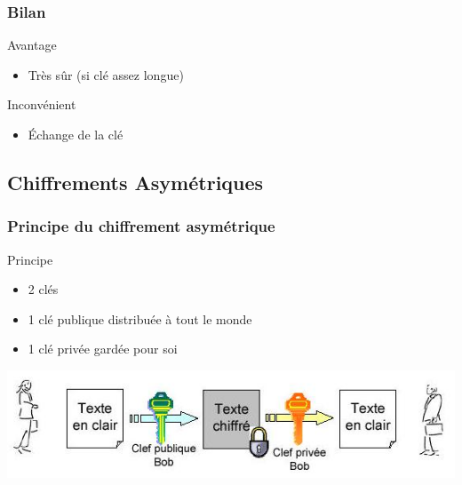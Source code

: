 \documentclass[xcolor={dvipsnames}]{beamer}
\begin{document}
\begin{frame}
	\frametitle{Bilan}
	
	\begin{exampleblock}{Avantage}
		\begin{itemize}
			\item Très sûr (si clé assez longue)			
		\end{itemize}
	\end{exampleblock}
	
	\begin{alertblock}{Inconvénient}
		\begin{itemize}
			\item \'Echange de la clé
		\end{itemize}
	\end{alertblock}
	
\end{frame}

\subsection{Chiffrements Asymétriques}

\begin{frame}
	\frametitle{Principe du chiffrement asymétrique}
	
	\begin{block}{Principe}
	
		\begin{itemize}
			\item 2 clés
			\item 1 clé publique distribuée à tout le monde
			\item 1 clé privée gardée pour soi
		\end{itemize}
	\end{block}
	
	\begin{center}
		\includegraphics[scale=0.6]{asym}
	\end{center}	
	
\end{frame}
\end{document}
